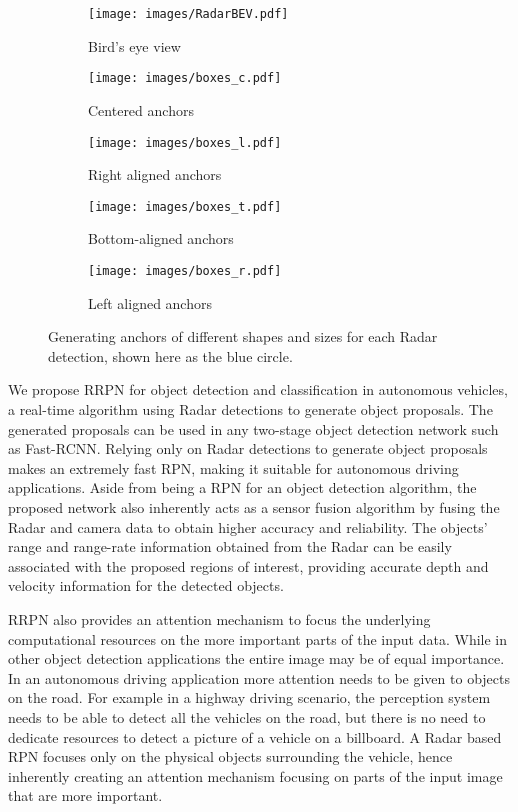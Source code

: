 \documentclass{article}
\begin{document}
\begin{figure*}[t]
\centering
 \begin{footnotesize}
  \begin{subfigure}{0.19\linewidth}
    \texttt{[image: images/RadarBEV.pdf]}
    \caption{Bird's eye view}
  \end{subfigure}
  \begin{subfigure}{0.19\linewidth}
    \texttt{[image: images/boxes\_c.pdf]}
    \caption{Centered anchors}
  \end{subfigure}
  \begin{subfigure}{0.19\linewidth}
    \texttt{[image: images/boxes\_l.pdf]}
    \caption{Right aligned anchors}
  \end{subfigure}
  \begin{subfigure}{0.2\linewidth}
    \texttt{[image: images/boxes\_t.pdf]}
    \caption{Bottom-aligned anchors}
  \end{subfigure}
  \begin{subfigure}{0.19\linewidth}
    \texttt{[image: images/boxes\_r.pdf]}
    \caption{Left aligned anchors}
  \end{subfigure}
   \end{footnotesize}
  \caption{Generating anchors of different shapes and sizes for each Radar detection, shown here as the blue circle.}
  \label{fig:boxes}
\end{figure*}

We propose RRPN for object detection and classification in autonomous vehicles, a real-time algorithm using Radar detections 
to generate object proposals. The generated proposals can be used in 
any two-stage object detection network such as Fast-RCNN. Relying only on Radar 
detections to generate object proposals makes an extremely fast RPN, 
making it suitable for autonomous driving applications.
Aside from being a RPN for an object detection algorithm, the proposed network also 
inherently acts as a sensor fusion algorithm by fusing the Radar and camera data to 
obtain higher accuracy and reliability. The objects' range and range-rate information 
obtained from the Radar can be easily associated with the proposed regions of interest, 
providing accurate depth and velocity information for the detected objects.

RRPN also provides an attention mechanism to focus the underlying computational resources 
on the more important parts of the input data. While in other object detection 
applications the entire image may be of equal importance. In an autonomous driving 
application more attention needs to be given to objects on the road. 
For example in a highway driving scenario, the perception system needs to be able 
to detect all the vehicles on the road, but there is no need to dedicate resources to 
detect a picture of a vehicle on a billboard. A Radar based RPN 
focuses only on the physical objects surrounding the vehicle, hence inherently 
creating an attention mechanism focusing on parts of the input image that 
are more important.
\end{document}
